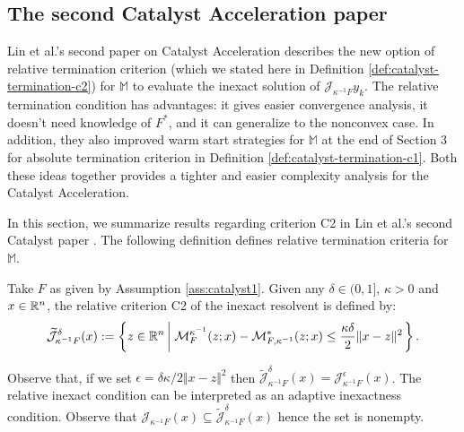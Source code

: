 \documentclass[12pt]{article}
\begin{document}
    \subsection{The second Catalyst Acceleration paper}\label{ssec:catalyst-second-paper}
        Lin et al.'s second paper on Catalyst Acceleration \cite{lin_catalyst_2018} describes the new option of relative termination criterion (which we stated here in Definition \ref{def:catalyst-termination-c2}) for $\mathbb M$ to evaluate the inexact solution of $\mathcal J_{\kappa^{-1}F}^{} y_k$. 
        The relative termination condition has advantages: it gives easier convergence analysis, it doesn't need knowledge of $F^*$, and it can generalize to the nonconvex case. 
        In addition, they also improved warm start strategies for $\mathbb M$ at the end of Section 3 for absolute termination criterion in Definition \ref{def:catalyst-termination-c1}.
        Both these ideas together provides a tighter and easier complexity analysis for the Catalyst Acceleration. 
        \par
        In this section, we summarize results regarding criterion C2 in Lin et al.'s second Catalyst paper \cite{lin_catalyst_2018}. 
        The following definition defines relative termination criteria for $\mathbb M$. 
        \begin{definition}\label{def:catalyst-termination-c2}
            Take $F$ as given by Assumption \ref{ass:catalyst1}. 
            Given any $\delta \in (0, 1]$, $\kappa > 0$ and $x \in \mathbb R^n$, the relative criterion C2 of the inexact resolvent is defined by: 
            \begin{align*}
                \widetilde{\mathcal J}_{\kappa^{-1}F}^\delta (x)
                := 
                \left\lbrace
                    z \in \mathbb R^n \left| \;
                        \mathcal M_F^{\kappa^{-1}}(z; x) - 
                        \mathcal M^*_{F, \kappa^{-1}}(z; x) 
                        \le \frac{\kappa\delta}{2}\Vert x - z\Vert^2
                    \right.
                \right\rbrace. 
            \end{align*}
        \end{definition}
        \begin{remark}
            Observe that, if we set $\epsilon = \delta\kappa/2\Vert x - z\Vert^2$ then $\widetilde{\mathcal J}_{\kappa^{-1}F}^{\delta} (x) = \mathcal J_{\kappa^{-1}F}^\epsilon (x)$. 
            The relative inexact condition can be interpreted as an adaptive inexactness condition.     
            Observe that $\mathcal J_{\kappa^{-1}F} (x) \subseteq \widetilde{\mathcal J}_{\kappa^{-1}F}^{\delta}(x)$ hence the set is nonempty. 
        \end{remark}
\end{document}
